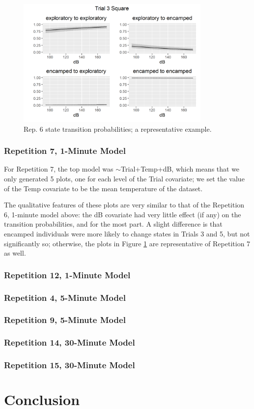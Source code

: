 \documentclass[12pt]{article}
\begin{document}
			\begin{figure}
				\centering
				\includegraphics[width=0.85\textwidth]{trans_rep_6_trial_3_square.png}
				\caption{Rep. 6 state transition probabilities; a representative example.}
				\label{img:rep6_1min_trans_tmnt}				
			\end{figure}
		
		\subsubsection{Repetition 7, 1-Minute Model}
		
			For Repetition 7, the top model was $\sim$Trial+Temp+dB, which means that we only generated 5 plots, one for each level of the Trial covariate; we set the value of the Temp covariate to be the mean temperature of the dataset.
			
			The qualitative features of these plots are very similar to that of the Repetition 6, 1-minute model above: the dB covariate had very little effect (if any) on the transition probabilities, and for the most part. A slight difference is that encamped individuals were more likely to change states in Trials 3 and 5, but not significantly so; otherwise, the plots in Figure \ref{img:rep6_1min_trans_tmnt} are representative of Repetition 7 as well.
		
		\subsubsection{Repetition 12, 1-Minute Model}
		
			
		
		\subsubsection{Repetition 4, 5-Minute Model}
		
		\subsubsection{Repetition 9, 5-Minute Model}
		
		\subsubsection{Repetition 14, 30-Minute Model}
		
		\subsubsection{Repetition 15, 30-Minute Model}

\section{Conclusion}



\end{document}
